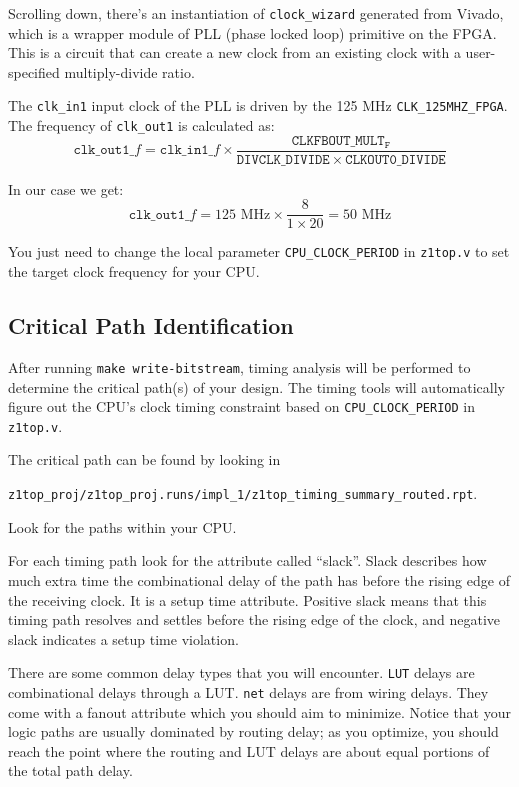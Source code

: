 \documentclass[11pt]{article}
\begin{document}
Scrolling down, there's an instantiation of \verb|clock_wizard| generated from Vivado, which is a wrapper module of PLL (phase locked loop) primitive on the FPGA.
This is a circuit that can create a new clock from an existing clock with a user-specified multiply-divide ratio.

The \verb|clk_in1| input clock of the PLL is driven by the 125 MHz \verb|CLK_125MHZ_FPGA|.
The frequency of \verb|clk_out1| is calculated as:
\begin{equation*}
  \mathtt{clk\_out1}\_f = \mathtt{clk\_in1}\_f \times \frac{\mathtt{CLKFBOUT\_MULT_F}}{\mathtt{DIVCLK\_DIVIDE} \times \mathtt{CLKOUT0\_DIVIDE}}
\end{equation*}

In our case we get:
\begin{equation*}
  \mathtt{clk\_out1}\_f = 125 \text{ MHz} \times \frac{8}{1 \times 20} = 50 \text{ MHz}
\end{equation*}

You just need to change the local parameter \verb|CPU_CLOCK_PERIOD| in \verb|z1top.v| to set the target clock frequency for your CPU.

\subsection{Critical Path Identification}
After running \verb|make write-bitstream|, timing analysis will be performed to determine the critical path(s) of your design.
The timing tools will automatically figure out the CPU's clock timing constraint based on \verb|CPU_CLOCK_PERIOD| in \verb|z1top.v|.

The critical path can be found by looking in

\verb|z1top_proj/z1top_proj.runs/impl_1/z1top_timing_summary_routed.rpt|.

Look for the paths within your CPU.

For each timing path look for the attribute called ``slack''.
Slack describes how much extra time the combinational delay of the path has before the rising edge of the receiving clock.
It is a setup time attribute.
Positive slack means that this timing path resolves and settles before the rising edge of the clock, and negative slack indicates a setup time violation.

There are some common delay types that you will encounter.
\verb|LUT| delays are combinational delays through a LUT.
\verb|net| delays are from wiring delays. They come with a fanout attribute which you should aim to minimize.
Notice that your logic paths are usually dominated by routing delay; as you optimize, you should reach the point where the routing and LUT delays are about equal portions of the total path delay.
\end{document}
